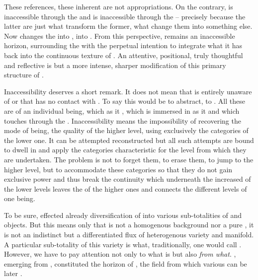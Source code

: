 These references, these inherent  are not appropriations.  On
the contrary,  is inaccessible through the  and
 is inaccessible through the  -- precisely because
the latter are just what transform the former, what change them into something
else. Now  changes the  into ,
into . From this
perspective,  remains an inaccessible horizon, surrounding the
 with the perpetual intention to integrate what it has
 back into the continuous texture of . An
attentive, positional, truly thoughtful and reflective  is but a more intense, sharper modification of this primary
structure of .

\pa Inaccessibility deserves a short remark. It does not mean that
 is entirely unaware of  or that 
has no contact with . To say this would be to abstract, to
. All these are  of an individual being, which
 as it , which is immersed in  as it
 and which touches  through the .
Inaccessibility means the impossibility of recovering the mode of being, the
quality of the higher level, using exclusively the categories of the lower one.
It can be attempted reconstructed but all such attempts are bound to dwell in
and apply the categories characteristic for the level from which they are
undertaken. The problem is not to forget them, to erase them, to jump to the
higher level, but to accommodate these categories so that they do not gain
exclusive power and thus break the continuity which underneath the increased
 of the lower levels leaves the  of the higher ones
and connects the different levels of one being.

\pa To be sure,  effected already diversification of
 into various sub-totalities of  and objects.  But this
means only that  is not a homogenous background nor a pure
, it is not an indistinct but a differentiated flux of heterogenous
variety and manifold.  A particular sub-totality of this variety is what,
traditionally, one would call .  However, we have to pay
attention not only to what is  but also {\em from what}.
, emerging from , constituted the horizon of
, the field from which various  can be later
.

